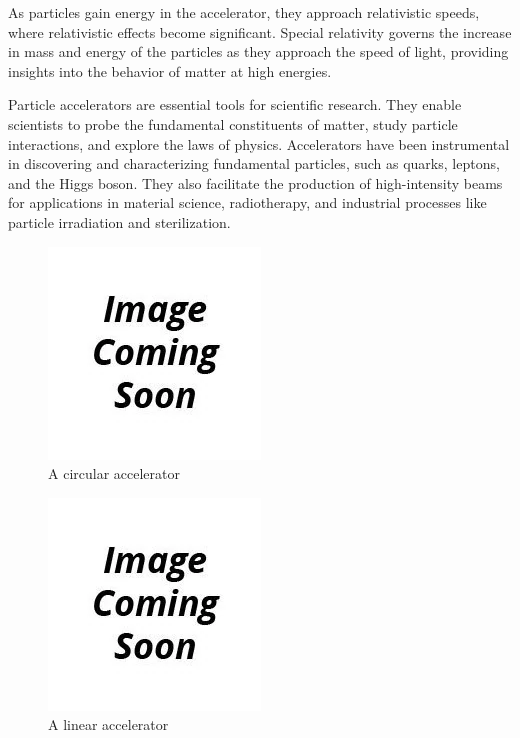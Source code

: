 \documentclass{article}
\begin{document}
As particles gain energy in the accelerator, they approach relativistic speeds, where relativistic effects become significant. 
Special relativity governs the increase in mass and energy of the particles as they approach the speed of light, providing insights into the behavior of matter at high energies.

Particle accelerators are essential tools for scientific research. They enable scientists to probe the fundamental constituents of matter, study particle interactions, and explore the laws of physics. 
Accelerators have been instrumental in discovering and characterizing fundamental particles, such as quarks, leptons, and the Higgs boson. 
They also facilitate the production of high-intensity beams for applications in material science, radiotherapy, and industrial processes like particle irradiation and sterilization.

\begin{figure}[H]
    \centering
    \includegraphics[scale=0.75]{../../../figures/to_be_added.png}
    \caption{A circular accelerator}
\end{figure}

\begin{figure}[H]
    \centering
    \includegraphics[scale=0.75]{../../../figures/to_be_added.png}
    \caption{A linear accelerator}
\end{figure}
\end{document}
